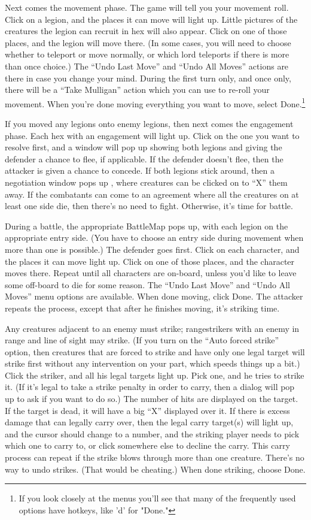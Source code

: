 \documentclass{article}
\begin{document}
Next comes the movement phase. The game will tell you your movement roll.
Click on a legion, and the places it can move will light up. Little pictures of
the creatures the legion can recruit in hex will also appear. Click on one of 
those places, and the legion will move there. (In some cases, you will need to 
choose whether to teleport or move normally, or which lord teleports if there 
is more than once choice.) The ``Undo Last Move'' and ``Undo All Moves'' 
actions are there in case you change your mind. During the first turn only, 
and once only, there will be a ``Take Mulligan'' action which you can use to 
re-roll your movement. When you're done moving everything you want to move, 
select Done.\footnote{If you look closely at the menus you'll see that many of 
the frequently used options have hotkeys, like 'd' for "Done."}

If you moved any legions onto enemy legions, then next comes the engagement
phase. Each hex with an engagement will light up. Click on the one you want
to resolve first, and a window will pop up showing both legions and giving the
defender a chance to flee, if applicable. If the defender doesn't flee, then
the attacker is given a chance to concede. If both legions stick around, then
a negotiation window pops up , where creatures can be clicked on to ``X'' them
away. If the combatants can come to an agreement where all the creatures on
at least one side die, then there's no need to fight. Otherwise, it's time
for battle.

During a battle, the appropriate BattleMap pops up, with each legion on the
appropriate entry side. (You have to choose an entry side during movement
when more than one is possible.) The defender goes first. Click on each
character, and the places it can move light up. Click on one of those
places, and the character moves there. Repeat until all characters are
on-board, unless you'd like to leave some off-board to die for some reason.
The ``Undo Last Move'' and ``Undo All Moves'' menu options are available. When
done moving, click Done. The attacker repeats the process, except that 
after he finishes moving, it's striking time.

Any creatures adjacent to an enemy must strike; rangestrikers with an enemy in
range and line of sight may strike. (If you turn on the ``Auto forced strike''
option, then creatures that are forced to strike and have only one legal
target will strike first without any intervention on your part, which speeds
things up a bit.) Click the striker, and all his legal targets light up. 
Pick one, and he tries to strike it. (If it's legal to take a strike penalty 
in order to carry, then a dialog will pop up to ask if you want to do so.) 
The number of hits are displayed on the target. If the target is dead, it 
will have a big ``X'' displayed over it. If there is excess damage that can 
legally carry over, then the legal carry target(s) will light up, and the
cursor should change to a number, and the striking player needs to pick 
which one to carry to, or click somewhere else to decline the carry. This 
carry process can repeat if the strike blows through more than one creature. 
There's no way to undo strikes. (That would be cheating.) When done 
striking, choose Done. 
\end{document}
